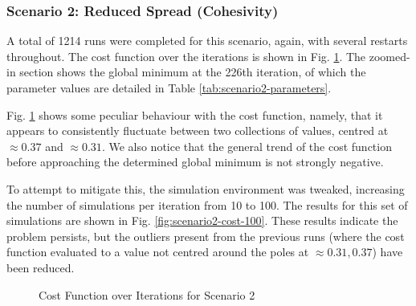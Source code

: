 \documentclass[12pt]{article}
\begin{document}
\subsubsection{Scenario 2: Reduced Spread (Cohesivity)}
A total of 1214 runs were completed for this scenario, again, with several restarts throughout. The cost function over the iterations is shown in Fig. \ref{fig:scenario2-cost}. The zoomed-in section shows the global minimum at the 226th iteration, of which the parameter values are detailed in Table \ref{tab:scenario2-parameters}.

Fig. \ref{fig:scenario2-cost} shows some peculiar behaviour with the cost function, namely, that it appears to consistently fluctuate between two collections of values, centred at $\approx 0.37$ and $\approx 0.31$. We also notice that the general trend of the cost function before approaching the determined global minimum is not strongly negative.

To attempt to mitigate this, the simulation environment was tweaked, increasing the number of simulations per iteration from 10 to 100. The results for this set of simulations are shown in Fig. \ref{fig:scenario2-cost-100}. These results indicate the problem persists, but the outliers present from the previous runs (where the cost function evaluated to a value not centred around the poles at $\approx 0.31, 0.37$) have been reduced.

\begin{figure}[ht]

    \centering
    \begin{subfigure}{.4\textwidth}
    \end{subfigure}
    \hfill
    \begin{subfigure}{.4\textwidth}
    \end{subfigure}
    \caption{Cost Function over Iterations for Scenario 2}
    \label{fig:scenario2-cost}

\end{figure}
\end{document}
